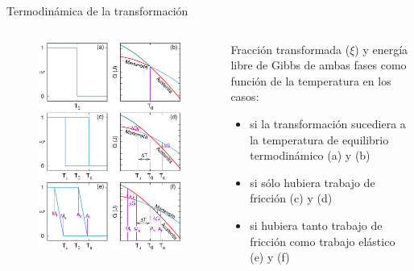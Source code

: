 \documentclass[11pt]{beamer}
\begin{document}
		\begin{frame}{Termodinámica de la transformación}
			\begin{columns}[T] %
				\begin{column}{.48\textwidth}
					\begin{figure}
						\includegraphics[scale=0.2]{img/Termo.eps}
					\end{figure}
				\end{column}
				\hfill
				\begin{column}{.48\textwidth}
				Fracción transformada ($\xi$) y energía libre de Gibbs de ambas fases como función de la temperatura en los casos: 
					\begin{itemize}
						\item si la transformación sucediera a la temperatura de equilibrio termodinámico (a) y (b)
						\item si sólo hubiera trabajo de fricción (c) y (d)
						\item si hubiera tanto trabajo de fricción como trabajo elástico (e) y (f)
					\end{itemize}
				\end{column}
			\end{columns}
		\end{frame}
		
\end{document}
